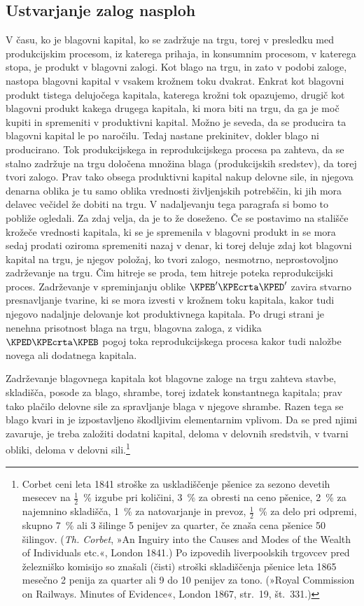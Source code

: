\documentclass[kapital_02.tex]{subfiles}
\begin{document}
\subsection{Ustvarjanje zalog nasploh}
V času, ko je blagovni kapital, ko se zadržuje na trgu, torej v presledku med produkcijskim procesom, iz katerega prihaja, in konsumnim procesom, v katerega stopa, je produkt v blagovni zalogi.
Kot blago na trgu, in zato v podobi zaloge, nastopa blagovni kapital v vsakem krožnem toku dvakrat.
Enkrat kot blagovni produkt tistega delujočega kapitala, katerega krožni tok opazujemo, drugič kot blagovni produkt kakega drugega kapitala, ki mora biti na trgu, da ga je moč kupiti in spremeniti v produktivni kapital.
Možno je seveda, da se producira ta blagovni kapital le po naročilu.
Tedaj nastane prekinitev, dokler blago ni producirano.
Tok produkcijskega in reprodukcijskega procesa pa zahteva, da se stalno zadržuje na trgu določena množina blaga (produkcijskih sredstev), da torej tvori zalogo.
Prav tako obsega produktivni kapital nakup delovne sile, in njegova denarna oblika je tu samo oblika vrednosti življenjskih potrebščin, ki jih mora delavec večidel že dobiti na trgu.
V nadaljevanju tega paragrafa si bomo to pobliže ogledali.
Za zdaj velja, da je to že doseženo.
Če se postavimo na stališče krožeče vrednosti kapitala, ki se je spremenila v blagovni produkt in se mora sedaj prodati oziroma spremeniti nazaj v denar, ki torej deluje zdaj kot blagovni kapital na trgu, je njegov položaj, ko tvori zalogo,\KPEstran\ nesmotrno, neprostovoljno zadrževanje na trgu.
Čim hitreje se proda, tem hitreje poteka reprodukcijski proces.
Zadrževanje v spreminjanju oblike \(\KPEB'\KPEcrta\KPED'\) zavira stvarno presnavljanje tvarine, ki se mora izvesti v krožnem toku kapitala, kakor tudi njegovo nadaljnje delovanje kot produktivnega kapitala.
Po drugi strani je nenehna prisotnost blaga na trgu, blagovna zaloga, z vidika \(\KPED\KPEcrta\KPEB\) pogoj toka reprodukcijskega procesa kakor tudi naložbe novega ali dodatnega kapitala.

Zadrževanje blagovnega kapitala kot blagovne zaloge na trgu zahteva stavbe, skladišča, posode za blago, shrambe, torej izdatek konstantnega kapitala; prav tako plačilo delovne sile za spravljanje blaga v njegove shrambe. 
Razen tega se blago kvari in je izpostavljeno škodljivim elementarnim vplivom.
Da se pred njimi zavaruje, je treba založiti dodatni kapital, deloma v delovnih sredstvih, v tvarni obliki, deloma v delovni sili.\footnote
{Corbet ceni leta 1841 stroške za uskladiščenje pšenice za sezono devetih mesecev na $\frac{1}{2}$~\% izgube pri količini, 3~\% za obresti na ceno pšenice, 2~\% za najemnino skladišča, 1~\% za natovarjanje in prevoz, $\frac{1}{2}$~\% za delo pri odpremi, skupno 7~\% ali 3 šilinge 5 penijev za quarter, če znaša cena pšenice 50 šilingov. 
(\emph{Th. Corbet}, »An Inguiry into the Causes and Modes of the Wealth of Individuals etc.«, London 1841.) Po izpovedih liverpoolskih trgovcev pred železniško komisijo so znašali (čisti) stroški skladiščenja pšenice leta 1865 mesečno 2 penija za quarter ali 9 do 10 penijev za tono.
(»Royal Commission on Railways. Minutes of Evidence«,
London 1867, str.\ 19, št.\ 331.)}
\end{document}
